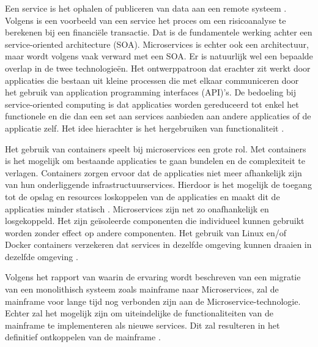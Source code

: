 Een service is het ophalen of publiceren van data aan een remote systeem \autocite{Linthicum2016}. Volgens \citeauthor{Linthicum2016} is een voorbeeld van een service het proces om een risicoanalyse te berekenen bij een financiële transactie. Dat is de fundamentele werking achter een service-oriented architecture (SOA). Microservices is echter ook een architectuur, maar wordt volgens \citeauthor{Linthicum2016} vaak verward met een SOA. Er is natuurlijk wel een bepaalde overlap in de twee technologieën. Het ontwerppatroon dat erachter zit werkt door applicaties die bestaan uit kleine processen die met elkaar communiceren door het gebruik van application programming interfaces (API)'s. De bedoeling bij service-oriented computing is dat applicaties worden gereduceerd tot enkel het functionele en die dan een set aan services aanbieden aan andere applicaties of de applicatie zelf. Het idee hierachter is het hergebruiken van functionaliteit \autocite{Linthicum2016}. 

Het gebruik van containers speelt bij microservices een grote rol. Met containers is het mogelijk om bestaande applicaties te gaan bundelen en de complexiteit te verlagen. Containers zorgen ervoor dat de applicaties niet meer afhankelijk zijn van hun onderliggende infrastructuurservices. Hierdoor is het mogelijk de toegang tot de opslag en resources loskoppelen van de applicaties en maakt dit de applicaties minder statisch \autocite{Linthicum2016a}. Microservices zijn net zo onafhankelijk en losgekoppeld. Het zijn geïsoleerde componenten die individueel kunnen gebruikt worden zonder effect op andere componenten. Het gebruik van Linux en/of Docker containers verzekeren dat services in dezelfde omgeving kunnen draaien in dezelfde omgeving \autocite{Bucchiarone2018}.

Volgens het rapport van \citeauthor{Bucchiarone2018} waarin de ervaring wordt beschreven van een migratie van een monolithisch systeem zoals mainframe naar Microservices, zal de mainframe voor lange tijd nog verbonden zijn aan de Microservice-technologie. Echter zal het mogelijk zijn om uiteindelijke de functionaliteiten van de mainframe te implementeren als nieuwe services. Dit zal resulteren in het definitief ontkoppelen van de mainframe \autocite{Bucchiarone2018}. 


\subsection{}
\label{sec:Workloads migreren naar de cloud}

